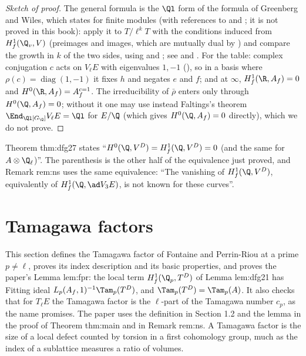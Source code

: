 \begin{proof}[Sketch of proof]
The general formula is the $\Ql$ form of the formula of Greenberg and Wiles, which  states for finite modules (with references to
\cite{Wiles95} and \cite{DDT}; it is not proved in this book): apply it to $T/\ell^kT$ with the
conditions induced from $H^1_f(\Q_v,V)$ (preimages and images, which are mutually dual by ) and compare the growth in $k$ of the
two sides, using  and ; see \cite{FPR94} and \cite[Section 1.7]{Rubin}. For the table: complex
conjugation $c$ acts on $V_\ell E$ with eigenvalues $1,-1$ (), so in a basis where $\rho(c)=\operatorname{diag}(1,-1)$ it fixes $h$ and negates $e$ and $f$; and at
$\infty$, $H^1_f(\R,A_f)=0$ and $H^0(\R,A_f)=A_f^{c=1}$. The irreducibility of $\bar\rho$ enters only through $H^0(\Q,A_f)=0$; without it one may use instead
Faltings's theorem $\End_{\Ql[G_\Q]}V_\ell E=\Ql$ for $E/\Q$ (which gives $H^0(\Q,A_f)=0$ directly), which we do not prove.
\end{proof}

\begin{paperlink}
Theorem thm:dfg27 states ``$H^0(\Q,V^D)=H^1_f(\Q,V^D)=0$ (and the same for $A\otimes\Q_\ell$)''. The parenthesis is the other half of the equivalence just proved,
and Remark rem:ns uses the same equivalence: ``The vanishing of $H^1_f(\Q,V^D)$, equivalently of $H^1_f(\Q,\ad V_3E)$, is not known for these curves''.
\end{paperlink}

\section{Tamagawa factors}\label{sec:blochkato:tamagawa}

This section defines the Tamagawa factor of Fontaine and Perrin-Riou at a prime $p\ne\ell$, proves its index description and its basic
properties, and proves the paper's Lemma lem:fpr: the local term $H^1_f(\Q_p,T^D)$ of Lemma lem:dfg21 has Fitting ideal $L_p(A_f,1)^{-1}\Tam_p(T^D)$, and
$\Tam_p(T^D)=\Tam_p(A)$. It also checks that for $T_\ell E$ the Tamagawa factor is the $\ell$-part of the Tamagawa number $c_p$, as the name promises. The
paper uses the definition in Section 1.2 and the lemma in the proof of Theorem thm:main and in Remark rem:ns. A Tamagawa factor is the size of a local
defect counted by torsion in a first cohomology group, much as the index of a sublattice measures a ratio of volumes.

